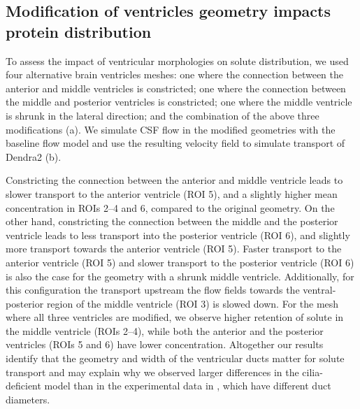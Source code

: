 \documentclass[fleqn]{wlscirep}
\begin{document}
\subsection*{Modification of ventricles geometry impacts protein distribution}
To assess the impact of ventricular morphologies on solute distribution,
we used four alternative brain ventricles meshes:
one where the connection between the anterior and middle ventricles is constricted;
one where the connection between the middle and posterior ventricles is constricted;
one where the middle ventricle is shrunk in the lateral direction;
and the combination of the above three modifications (a).
We simulate CSF flow in the modified geometries with the baseline flow model
and use the resulting velocity field to simulate transport of Dendra2 (b).

Constricting the connection between the anterior and middle ventricle leads to
slower transport to the anterior ventricle (ROI 5),
and a slightly higher mean concentration in ROIs 2--4 and 6, compared to the original geometry.
On the other hand, constricting the connection between the middle and the posterior ventricle
leads to less transport into the posterior ventricle (ROI 6),
and slightly more transport towards the anterior ventricle (ROI 5).
Faster transport to the anterior ventricle (ROI 5) and slower transport to the
posterior ventricle (ROI 6) is also the case for the geometry with a shrunk middle ventricle.
Additionally, for this configuration the transport upstream the flow fields towards the
ventral-posterior region of the middle ventricle (ROI 3) is slowed down.
For the mesh where all three ventricles are modified,
we observe higher retention of solute in the middle ventricle (ROIs 2--4),
while both the anterior and the posterior ventricles (ROIs 5 and 6) have lower concentration.
Altogether our results identify that the geometry and width of the ventricular ducts matter
for solute transport and may explain why we observed larger differences
in the cilia-deficient model than in the experimental data in
, which have different duct diameters.
\end{document}
